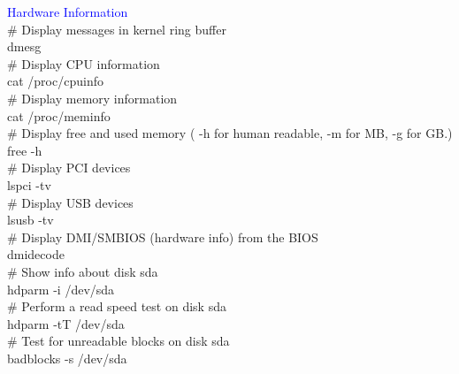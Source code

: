 \documentclass{article}
\begin{document}
\textcolor{blue}{Hardware Information}\\
\noindent
\# Display messages in kernel ring buffer\\
dmesg\\
\# Display CPU information\\
cat /proc/cpuinfo\\
\# Display memory information\\
cat /proc/meminfo\\
\# Display free and used memory ( -h for human readable, -m for MB, -g for GB.)\\
free -h\\
\# Display PCI devices\\
lspci -tv\\
\# Display USB devices\\
lsusb -tv\\
\# Display DMI/SMBIOS (hardware info) from the BIOS\\
dmidecode\\
\# Show info about disk sda\\
hdparm -i /dev/sda\\
\# Perform a read speed test on disk sda\\
hdparm -tT /dev/sda\\
\# Test for unreadable blocks on disk sda\\
badblocks -s /dev/sda\\
\end{document}
